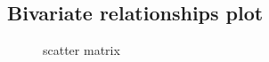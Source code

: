 \documentclass[article]{jss}
\begin{document}

\subsection{Bivariate relationships plot}




\begin{figure}[htbp]
\centering
{}
\caption{\label{fig:scaMatrix} scatter matrix}
\end{figure}
\end{document}
